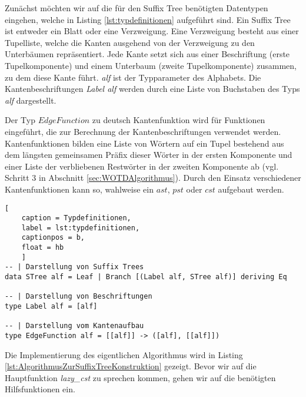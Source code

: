 \documentclass[12pt]{report}
\begin{document}
Zunächst möchten wir auf die für den Suffix Tree benötigten Datentypen eingehen, welche in Listing \ref{lst:typdefinitionen} aufgeführt sind. Ein Suffix Tree ist entweder ein Blatt oder eine Verzweigung. Eine Verzweigung besteht aus einer Tupelliste, welche die Kanten ausgehend von der Verzweigung zu den Unterbäumen repräsentiert. Jede Kante setzt sich aus einer Beschriftung (erste Tupelkomponente) und einem Unterbaum (zweite Tupelkomponente) zusammen, zu dem diese Kante führt. \textit{alf} ist der Typparameter des Alphabets. Die Kantenbeschriftungen \textit{Label alf} werden durch eine Liste von Buchstaben des Typs \textit{alf} dargestellt.

Der Typ $EdgeFunction$ zu deutsch Kantenfunktion wird für Funktionen eingeführt, die zur Berechnung der Kantenbeschriftungen verwendet werden. Kantenfunktionen bilden eine Liste von Wörtern auf ein Tupel bestehend aus dem längsten gemeinsamen Präfix dieser Wörter in der ersten Komponente und einer Liste der verbliebenen Restwörter in der zweiten Komponente ab (vgl. Schritt 3 in Abschnitt \ref{sec:WOTDAlgorithmus}). Durch den Einsatz verschiedener Kantenfunktionen kann so, wahlweise ein $ast$, $pst$ oder $cst$ aufgebaut werden.

\begin{lstlisting}[
    caption = Typdefinitionen,
    label = lst:typdefinitionen,
    captionpos = b,
    float = hb
    ]
-- | Darstellung von Suffix Trees
data STree alf = Leaf | Branch [(Label alf, STree alf)] deriving Eq

-- | Darstellung von Beschriftungen
type Label alf = [alf]

-- | Darstellung vom Kantenaufbau
type EdgeFunction alf = [[alf]] -> ([alf], [[alf]])
\end{lstlisting}

Die Implementierung des eigentlichen Algorithmus wird in Listing \ref{lst:AlgorithmusZurSuffixTreeKonstruktion} gezeigt. Bevor wir auf die Hauptfunktion \textit{lazy\_cst} zu sprechen kommen, gehen wir auf die benötigten Hilfsfunktionen ein.
\end{document}
